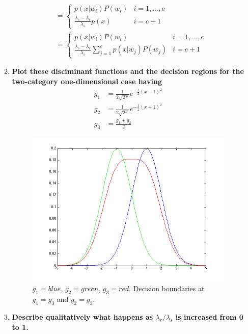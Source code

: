 \documentclass[12pt]{article}
\begin{document}
\begin{enumerate}
\begin{enumerate}
\begin{equation}
\begin{split}
      & = \left\{ \begin{array}{ll}p(x|w_i)P(w_i) & i = 1, ..., c \\ \frac{\lambda_s -\lambda_r}{\lambda_s}p(x) & i = c+1 \end{array} \right. \\
      & \boxed{= \left\{ \begin{array}{ll}p(x|w_i)P(w_i) & i = 1, ..., c \\ \frac{\lambda_s-\lambda_r}{\lambda_s}\sum_{j=1}^c p(x|w_j)P(w_j) & i = c+1 \end{array} \right.}
    \end{split}
    \end{equation}
  \item \textbf{Plot these disciminant functions and the decision regions for the two-category one-dimensional case having}
    \begin{equation}
    \begin{split}
      g_1& = \frac{1}{2\sqrt{2\pi}}e^{-\frac{1}{2}(x-1)^2} \\
      g_2& = \frac{1}{2\sqrt{2\pi}}e^{-\frac{1}{2}(x+1)^2} \\
      g_3& = \frac{g_1 + g_2}{2}
    \end{split}
    \end{equation}
    \begin{figure}[H]
      \includegraphics[width=\textwidth]{14b}
      \caption{$g_1 = blue$, $g_2 = green$, $g_3 = red$. Decision boundaries at $g_1 = g_3$ and $g_2 = g_3$.}
    \end{figure}
  \item \textbf{Describe qualitatively what happens as $\lambda_r/\lambda_s$ is increased from 0 to 1.} \\

\end{enumerate}
\end{enumerate}
\end{document}
